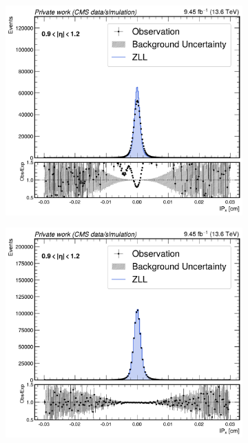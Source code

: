 \begin{figure}[!htbp]
        \vspace{0.5cm}

        \begin{subfigure}[b]{0.49\textwidth}
            \centering
            \includegraphics[width=\textwidth]{Figures/Chapter7/IP_Corrections/Before/mumu/ip_x_0p9to1p2_comparison_with_ratio.pdf}
            \caption{}
        \end{subfigure}
        \begin{subfigure}[b]{0.49\textwidth}
            \centering
            \includegraphics[width=\textwidth]{Figures/Chapter7/IP_Corrections/After/mumu/ip_x_0p9to1p2_comparison_with_ratio.pdf}

\end{subfigure}
\end{figure}
